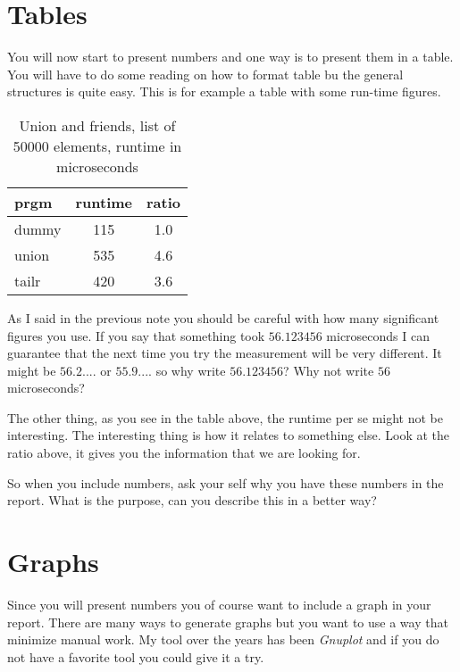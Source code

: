 \documentclass[a4paper,11pt]{article}
\begin{document}
\section*{Tables}

You will now start to present numbers and one way is to present them
in a table. You will have to do some reading on how to format table bu
the general structures is quite easy. This is for example a table with
some run-time figures.

\begin{table}[h]
\begin{center}
\begin{tabular}{l|c|c}
\textbf{prgm} & \textbf{runtime} & \textbf{ratio}\\
\hline
  dummy      &  115 &     1.0\\
  union      &  535 &     4.6\\
  tailr      &  420 &     3.6\\
\end{tabular}
\caption{Union and friends, list of 50000 elements, runtime in microseconds}
\label{tab:table1}
\end{center}
\end{table}

As I said in the previous note you should be careful with how many
significant figures you use. If you say that something took
$56.123456$ microseconds I can guarantee that the next time you try
the measurement will be very different. It might be $56.2....$ or
$55.9....$ so why write $56.123456$?  Why not write $56$ microseconds?

The other thing, as you see in the table above, the runtime per se
might not be interesting. The interesting thing is how it relates to
something else. Look at the ratio above, it gives you the information
that we are looking for.

So when you include numbers, ask your self why you have these numbers
in the report. What is the purpose, can you describe this in a better
way?

\section*{Graphs}

Since you will present numbers you of course want to include a graph
in your report. There are many ways to generate graphs but you want to
use a way that minimize manual work. My tool over the years has been
{\em Gnuplot} and if you do not have a favorite tool you could give it
a try.
\end{document}
